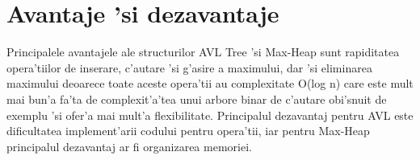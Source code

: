 \section{Avantaje 'si dezavantaje}
Principalele avantajele ale structurilor AVL Tree 'si Max-Heap sunt rapiditatea opera'tiilor de inserare, c'autare 'si g'asire a maximului, dar 'si eliminarea maximului deoarece toate aceste opera'tii au complexitate O(log n) care este mult mai bun'a fa'ta de complexit'a'tea unui arbore binar de c'autare obi'snuit de exemplu 'si ofer'a mai mult'a flexibilitate. Principalul dezavantaj pentru AVL este dificultatea implement'arii codului pentru opera'tii, iar pentru Max-Heap  principalul dezavantaj ar fi organizarea memoriei.


